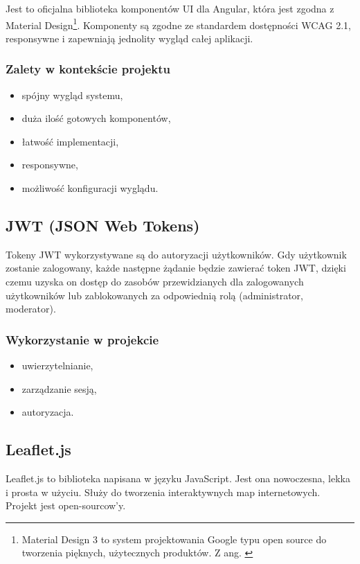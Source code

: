 Jest to oficjalna biblioteka komponentów UI dla Angular, która jest zgodna z Material Design\footnote{Material Design 3 to system projektowania Google typu open source do tworzenia pięknych, użytecznych produktów. Z ang. \cite{material_design}}.
Komponenty są zgodne ze standardem dostępności WCAG 2.1, responsywne i zapewniają jednolity wygląd całej aplikacji.

\subsubsection{Zalety w kontekście projektu}
\begin{itemize}
	\item spójny wygląd systemu,
	\item duża ilość gotowych komponentów,
	\item łatwość implementacji,
	\item responsywne,
	\item możliwość konfiguracji wyglądu.
\end{itemize}

\subsection{JWT (JSON Web Tokens)}

Tokeny JWT wykorzystywane są do autoryzacji użytkowników. Gdy użytkownik zostanie zalogowany, każde następne żądanie będzie zawierać token JWT, dzięki czemu uzyska on dostęp do zasobów przewidzianych dla zalogowanych użytkowników lub zablokowanych za odpowiednią rolą (administrator, moderator).

\subsubsection{Wykorzystanie w projekcie}

\begin{itemize}
	\item uwierzytelnianie,
	\item zarządzanie sesją,
	\item autoryzacja.
\end{itemize}

\subsection{Leaflet.js}
Leaflet.js to biblioteka napisana w języku JavaScript. Jest ona nowoczesna, lekka i prosta w użyciu. Służy do tworzenia interaktywnych map internetowych. Projekt jest open-sourcow'y.

